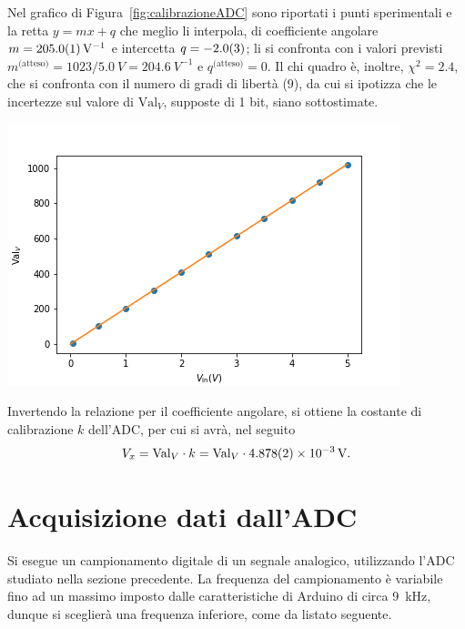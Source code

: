 \documentclass[10pt,oneside,a4paper]{article}
\newenvironment{Figure}
  {\par\medskip\noindent\minipage{\linewidth}}
  {\endminipage\par\medskip}
\begin{document}
\begin{multicols}{2}
Nel grafico di Figura~\ref{fig:calibrazioneADC} sono riportati i punti sperimentali e la retta $y = mx+q$ che meglio li interpola, di coefficiente angolare $m = \SI{205.0 \pm 0.1}{V^{-1}}$ e intercetta $q = \SI{-2.0 \pm 0.3}{}$; li si confronta con i valori previsti $m^{\text{(atteso)}} = 1023/\SI{5.0}{V} = \SI{204.6}{V^{-1}}$ e $q^{\text{(atteso)}} = 0$. Il chi quadro è, inoltre, $\chi^2 = 2.4$, che si confronta con il numero di gradi di libertà ($9$), da cui si ipotizza che le incertezze sul valore di $\text{Val}_V$, supposte di 1 bit, siano sottostimate.

\begin{Figure}
	\begin{center}
	\includegraphics[width=\linewidth]{calibrazioneADC.png}
	\label{fig:calibrazioneADC}
	\end{center}
\end{Figure}

Invertendo la relazione per il coefficiente angolare, si ottiene la costante di calibrazione $k$ dell'ADC, per cui si avrà, nel seguito
\[
V_x = \text{Val}_V \cdot k = \text{Val}_V \cdot \SI{4.878 \pm 0.002 e-3}{V}.
\]

\section{Acquisizione dati dall'ADC}
Si esegue un campionamento digitale di un segnale analogico, utilizzando l'ADC studiato nella sezione precedente. La frequenza del campionamento è variabile fino ad un massimo imposto dalle caratteristiche di Arduino di circa \SI{9}{\kilo \Hz}, dunque si sceglierà una frequenza inferiore, come da listato seguente.


\end{multicols}
\end{document}
